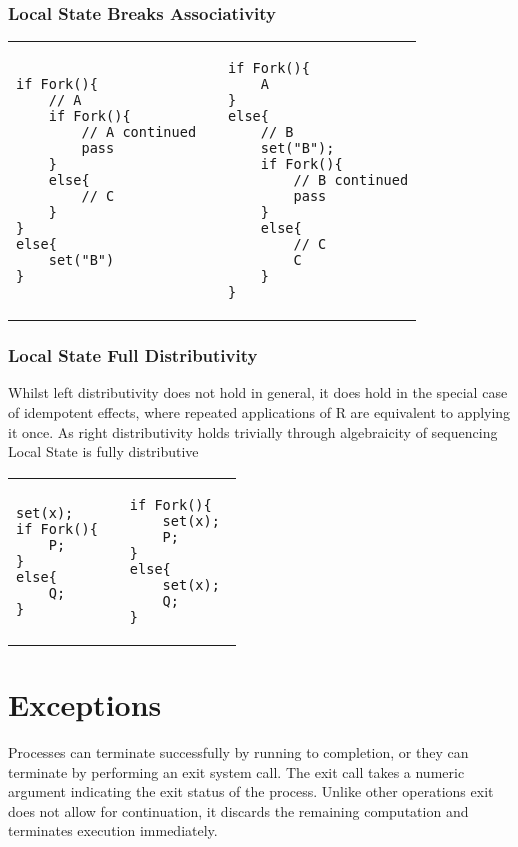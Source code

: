 \documentclass[logo,bsc,singlespacing,parskip]{infthesis}
\begin{document}
\subsubsection*{Local State Breaks Associativity}
\begin{table}[H]
\centering
\begin{tabular}{p{} c p{}}
\begin{lstlisting}
if Fork(){
    // A
    if Fork(){
        // A continued
        pass
    }
    else{
        // C
    }
}
else{
    set("B")
}
\end{lstlisting}
&
&
\begin{lstlisting}
if Fork(){
    A
} 
else{
    // B
    set("B");
    if Fork(){
        // B continued
        pass
    }
    else{
        // C
        C
    }
}
\end{lstlisting}
\end{tabular}
\end{table}
\vspace{-2em}


\subsubsection*{Local State Full Distributivity}
Whilst left distributivity does not hold in general, it does hold in the special case of idempotent effects, where repeated applications of R are equivalent to applying it once. As right distributivity holds trivially through algebraicity of sequencing Local State is fully distributive 

\vspace{-2em}
\begin{table}[H]
\centering
\begin{tabular}{p{} c p{}}
\begin{lstlisting}
set(x);
if Fork(){
    P;
}
else{
    Q;
}
\end{lstlisting}
&
&
\begin{lstlisting}
if Fork(){
    set(x); 
    P;
}
else{ 
    set(x); 
    Q;
}
\end{lstlisting}
\end{tabular}
\end{table}
\vspace{-2em}

\section{Exceptions}
Processes can terminate successfully by running to completion, or they can terminate by performing an exit system call. The exit call takes a numeric argument indicating the exit status of the process. Unlike other operations exit does not allow for continuation, it discards the remaining computation and terminates execution immediately.
\end{document}
